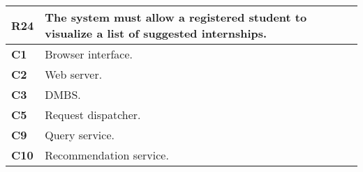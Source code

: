 \begin{table}[H]
    \centering
    \begin{tabular}{|l|m{10cm}|}
        \hline \textbf{R24} & The system must allow a registered student to visualize a list of suggested internships.\\
        \hline \textbf{C1} & Browser interface. \\
        \hline \textbf{C2} & Web server. \\
        \hline \textbf{C3} & DMBS. \\
        \hline \textbf{C5} & Request dispatcher. \\
        \hline \textbf{C9} & Query service. \\
        \hline \textbf{C10} & Recommendation service. \\
        \hline
    \end{tabular}
\end{table}

